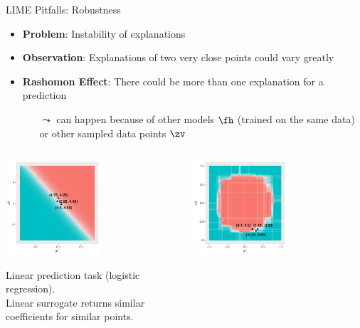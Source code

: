 \documentclass[11pt,compress,t,notes=noshow, aspectratio=169, xcolor=table]{beamer}
\begin{document}
\begin{vbframe}[c]{LIME Pitfalls: Robustness }
\begin{itemize}
	\item \textbf{Problem}: Instability of explanations 
	\item \textbf{Observation}: Explanations of two very close points could vary greatly 
	\item \textbf{Rashomon Effect}: There could be more than one explanation for a prediction
	\begin{itemize}
	    \item[$\leadsto$] can happen because of other models $\fh$ (trained on the same data) or other sampled data points $\zv$
	\end{itemize}
\end{itemize}
\vspace{-0.7cm}
\begin{columns}
	\begin{column}{0.48\textwidth}
		\begin{center}
		
		\includegraphics[width=0.55\textwidth]{figure/lime_robustness_1.png}
		
		{Linear prediction task (logistic regression). \\Linear surrogate returns similar coefficients for similar points.}
		
		\end{center}
	\end{column}
	\begin{column}{0.48\textwidth}
		\begin{center}
	\includegraphics[width=0.55\textwidth]{figure/lime_robustness_2.png}
	

\end{center}
\end{column}
\end{columns}
\end{vbframe}
\end{document}
